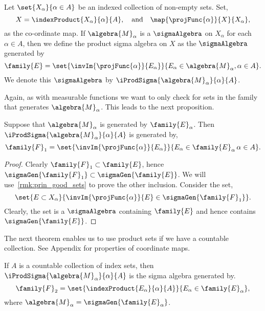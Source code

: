 \begin{Definition}[name=Product sigma algebra]
    Let $\set{X_{\alpha}}{\alpha \in A}$ be an indexed collection of non-empty sets. Set,
    \[X = \indexProduct{X_{\alpha}}{\alpha}{A},\quad\text{and}\quad\map{\projFunc{\alpha}}{X}{X_{\alpha}},\]
    as the co-ordinate map. If $\algebra{M}_{\alpha}$ is a $\sigmaAlgebra$ on $X_{\alpha}$ for each $\alpha
    \in A$, then we define the product sigma algebra on $X$ as the $\sigmaAlgebra$ generated by
    \[\family{E} = \set{\invIm{\projFunc{\alpha}}{E_{\alpha}}}{E_{\alpha}\in\algebra{M}_{\alpha},\alpha\in A}.\]
    We denote this $\sigmaAlgebra$ by $\iProdSigma{\algebra{M}_{\alpha}}{\alpha}{A}$.
\end{Definition}
Again, as with measurable functions we want to only check for sets in the family that generates
$\algebra{M}_{\alpha}$. This leads to the next proposition.
\begin{Proposition}\label{prop:prod_sigma_gen}
    Suppose that $\algebra{M}_{\alpha}$ is generated by $\family{E}_{\alpha}$. Then
    $\iProdSigma{\algebra{M}_{\alpha}}{\alpha}{A}$ is generated by,
    \[\family{F}_{1} = 
	\set{\invIm{\projFunc{\alpha}}{E_{\alpha}}}{E_{\alpha} \in \family{E}_{\alpha}\,\alpha\in A}.\]
\end{Proposition}
\begin{proof}
    Clearly $\family{F}_{1} \subset \family{E}$, hence $\sigmaGen{\family{F}_{1}} \subset \sigmaGen{\family{E}}$. We
    will use~\ref{rmk:prin_good_sets} to prove the other inclusion. Consider the set,
    \[\set{E\subset X_{\alpha}}{\invIm{\projFunc{\alpha}}{E}\in\sigmaGen{\family{F}_{1}}}.\]
    Clearly, the set is a $\sigmaAlgebra$ containing $\family{E}$ and hence contains $\sigmaGen{\family{E}}$.
\end{proof}
The next theorem enables us to use product sets if we have a countable collection. See Appendix for properties
of coordinate maps.
\begin{Proposition}\label{prop:prod_sigma_gen_countable}
    If $A$ is a countable collection of index sets, then $\iProdSigma{\algebra{M}_{\alpha}}{\alpha}{A}$ is the
    sigma algebra generated by.
    \[\family{F}_{2} = \set{\indexProduct{E_{\alpha}}{\alpha}{A}}{E_{\alpha} \in \family{E}_{\alpha}},\]
    where $\algebra{M}_{\alpha} = \sigmaGen{\family{E}_{\alpha}}$.
\end{Proposition}
